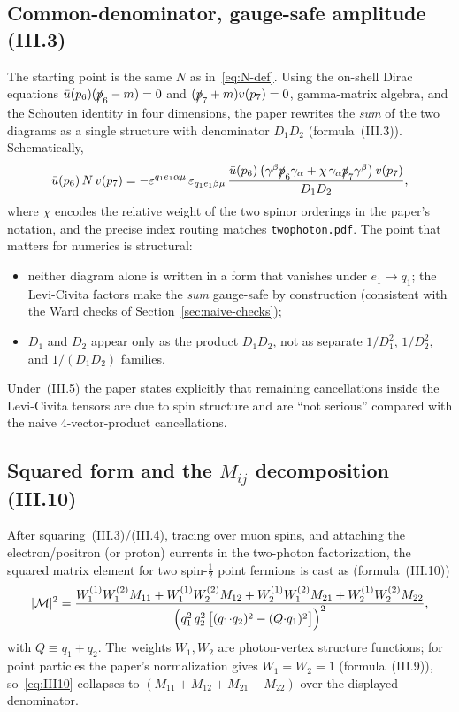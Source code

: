 \documentclass[11pt]{article}
\begin{document}
\subsection{Common-denominator, gauge-safe amplitude (III.3)}
\label{sec:stable-amp}

The starting point is the same $N$ as in~\eqref{eq:N-def}. Using the
on-shell Dirac equations
$\bar u(p_6)(\slashed p_6-m)=0$ and $(\slashed p_7+m)v(p_7)=0$,
gamma-matrix algebra, and the Schouten identity in four dimensions, the
paper rewrites the \emph{sum} of the two diagrams as a single structure
with denominator $D_1 D_2$ (formula~(III.3)). Schematically,
\begin{equation}
  \bar u(p_6)\,N\,v(p_7)
  = -\varepsilon^{q_1 e_1\alpha\mu}\,
      \varepsilon_{q_1 e_1\beta\mu}\,
      \frac{\bar u(p_6)\,
        \bigl(\gamma^\beta\slashed p_6\gamma_\alpha
              +\chi\,\gamma_\alpha\slashed p_7\gamma^\beta\bigr)
      \,v(p_7)}{D_1 D_2},
  \label{eq:III3-schematic}
\end{equation}
where $\chi$ encodes the relative weight of the two spinor orderings in
the paper's notation, and the precise index routing matches
\texttt{twophoton.pdf}. The point that matters for numerics is
structural:
\begin{itemize}
  \item neither diagram alone is written in a form that vanishes under
    $e_1\to q_1$; the Levi-Civita factors make the
    \emph{sum} gauge-safe by construction (consistent with the Ward
    checks of Section~\ref{sec:naive-checks});
  \item $D_1$ and $D_2$ appear only as the product $D_1 D_2$, not as
    separate $1/D_1^2$, $1/D_2^2$, and $1/(D_1 D_2)$ families.
\end{itemize}
Under~(III.5) the paper states explicitly that remaining cancellations
inside the Levi-Civita tensors are due to spin structure and are ``not
serious'' compared with the naive 4-vector-product cancellations.

\subsection{Squared form and the $M_{ij}$ decomposition (III.10)}
\label{sec:stable-Mij}

After squaring~(III.3)/(III.4), tracing over muon spins, and attaching
the electron/positron (or proton) currents in the two-photon
factorization, the squared matrix element for two spin-$\tfrac12$ point
fermions is cast as (formula~(III.10))
\begin{equation}
  |\mathcal M|^2
  = \frac{
      W_1^{(1)}W_1^{(2)} M_{11}
      + W_1^{(1)}W_2^{(2)} M_{12}
      + W_2^{(1)}W_1^{(2)} M_{21}
      + W_2^{(1)}W_2^{(2)} M_{22}
    }{
      \Bigl(
        q_1^2\, q_2^2\,
        \bigl[(q_1{\cdot}q_2)^2 - (Q{\cdot}q_1)^2\bigr]
      \Bigr)^2
    },
  \label{eq:III10}
\end{equation}
with $Q\equiv q_1+q_2$. The weights $W_1,W_2$ are photon-vertex structure
functions; for point particles the paper's normalization gives
$W_1=W_2=1$ (formula~(III.9)), so~\eqref{eq:III10} collapses to
$(M_{11}+M_{12}+M_{21}+M_{22})$ over the displayed denominator.
\end{document}
